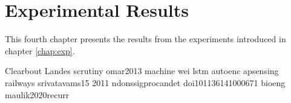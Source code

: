 \chapter{Experimental Results}
\label{chap:results}

This fourth chapter presents the results from the experiments introduced in chapter \ref{chap:exp}. 






Clearbout \cite{claerbout1991scrutiny}
Landes scrutiny \cite{landes1951scrutiny}
omar2013 machine \cite{omar2013machine}
wei lstm autoenc \cite{wei2022lstmautoencoder}
apsensing railways \cite{apSensing2019railwaydas}
srivatavams15 \cite{DBLP:journals/corr/SrivastavaMS15}
2011 ndonssigprocandet \cite{2011ndongsigprocandet}
doi101136141000671 \cite{doi:10.1137/141000671}
bioeng \cite{bioengineering10040405}
maulik2020recurr \cite{maulik2020recurrent}




